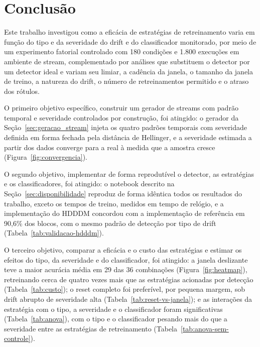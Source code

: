 \chapter{Conclusão}
\label{chap:conclusao}

Este trabalho investigou como a eficácia de estratégias de retreinamento
varia em função do tipo e da severidade do drift e do classificador
monitorado, por meio de um experimento fatorial controlado com 180 condições
e 1.800 execuções em ambiente de stream, complementado por análises que
substituem o detector por um detector ideal e variam seu limiar, a cadência da janela, o tamanho da janela de treino, a
natureza do drift, o número de retreinamentos permitido e o atraso dos
rótulos.

O primeiro objetivo específico, construir um gerador de streams com padrão
temporal e severidade controlados por construção, foi atingido: o gerador
da Seção~\ref{sec:geracao_stream} injeta os quatro padrões temporais com
severidade definida em forma fechada pela distância de Hellinger, e a
severidade estimada a partir dos dados converge para a real à medida que a
amostra cresce (Figura~\ref{fig:convergencia}).

O segundo objetivo, implementar de forma reprodutível o detector, as
estratégias e os classificadores, foi atingido: o notebook descrito na
Seção~\ref{sec:disponibilidade} reproduz de forma idêntica todos os resultados
do trabalho, exceto os tempos de treino, medidos em tempo de relógio, e a implementação do HDDDM concordou com a
implementação de referência em 90,6\% dos blocos, com o mesmo padrão de
detecção por tipo de drift (Tabela~\ref{tab:validacao-hdddm}).

O terceiro objetivo, comparar a eficácia e o custo das estratégias e
estimar os efeitos do tipo, da severidade e do classificador, foi atingido:
a janela deslizante teve a maior acurácia média em 29 das 36 combinações
(Figura~\ref{fig:heatmap}), retreinando cerca de quatro vezes mais que as
estratégias acionadas por detecção (Tabela~\ref{tab:custo}); o reset
completo foi preferível, por pequena margem, sob drift abrupto de severidade
alta (Tabela~\ref{tab:reset-vs-janela}); e as interações da estratégia com o
tipo, a severidade e o classificador foram significativas
(Tabela~\ref{tab:anova}), com o tipo e o classificador pesando mais do que a
severidade entre as estratégias de retreinamento
(Tabela~\ref{tab:anova-sem-controle}).

